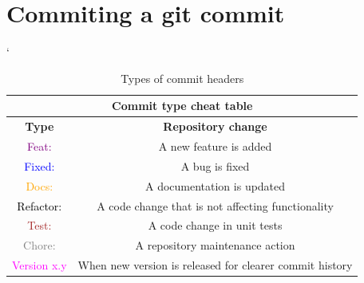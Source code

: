 
\section{Commiting a git commit}

\begin{table} [H]
	\centering
	\catcode`
	\begin{tabular}[c]{|| c | c ||}
	\hline
		\multicolumn{2}{||c||}{ \textbf{Commit type cheat table}} \\
	\hline
 		 \textbf{Type} & \textbf{Repository change} \\
	\hline
		\textcolor{purple}{Feat:} & A new feature is added \\
	\hline
		\textcolor{blue}{Fixed:} & A bug is fixed \\
	\hline
		\textcolor{orange}{Docs:} & A documentation is updated \\
	\hline
		\textcolor{black}{Refactor:} & A code change that is not affecting functionality \\
	\hline
		\textcolor{brown}{Test:} & A code change in unit tests \\
	\hline
		\textcolor{gray}{Chore:} & A repository maintenance action \\
	\hline
		\textcolor{magenta}{Version x.y} & When new version is released for clearer commit history \\
	\hline
	\end{tabular}
	\caption{Types of commit headers}
	\label{table:cmtHeaders}
\end{table}